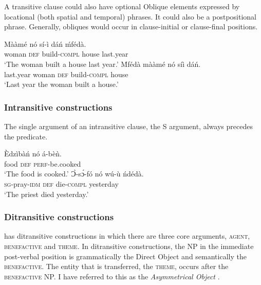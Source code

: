\documentclass[output=paper]{langsci/langscibook}
\begin{document}
A transitive clause could also have optional Oblique elements expressed by locational (both spatial and temporal) phrases. It could also be a postpositional phrase. Generally, obliques would occur in clause-initial or clause-final positions. 

\ea\label{ex:16.osam}
\ea\label{ex:16a.osam}
\gll   Mààmé    nó  sí-ì    dáń  ḿfédà.\\
       woman    \textsc{def}  build-\textsc{compl}  house  last.year\\
\glt   `The woman built a house last year.'
\ex\label{ex:16b.osam}
\gll   \'{M}fédà    mààmé    nó  síì    dáń.\\
       last.year  woman    \textsc{def}  build-\textsc{compl}  house\\
\glt   `Last year the woman built a house.'
\z 
\z 


\subsubsection{Intransitive constructions}\label{§2.3.2:intransitive.osam}

The single argument of an intransitive clause, the S argument, always precedes the predicate. 

\ea\label{ex:17.osam}
\ea\label{ex:17a.osam}
\gll  Èdzìbàń  nó  á-bèǹ.  \\
       food    \textsc{def}  \textsc{perf}-be.cooked\\
\glt   `The food is cooked.'  
\ex\label{ex:17b.osam}
\gll   Ɔ̀-sɔ́-fó      nó  wú-ù    ńdédà.\\
       \textsc{sg}-pray-\textsc{idm}    \textsc{def}  die-\textsc{compl}  yesterday\\
\glt   `The priest died yesterday.'
\z 
\z 

\subsubsection{Ditransitive constructions}\label{§2.3.3:ditransitive.osam}

 has ditransitive constructions in which there are three core arguments, \textsc{agent, benefactive} and \textsc{theme}. In ditransitive constructions, the NP in the immediate post-verbal position is grammatically the Direct Object and semantically the \textsc{benefactive}. The entity that is transferred, the \textsc{theme}, occurs after the \textsc{benefactive} NP. I have referred to this as the \textit{Asymmetrical Object} \citep{osam2000}.
\end{document}
